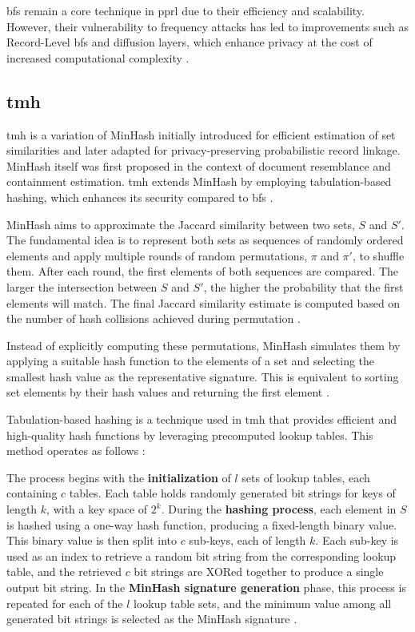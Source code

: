 \ac{bf}s remain a core technique in \ac{pprl} due to their efficiency and scalability.
However, their vulnerability to frequency attacks has led to improvements such as Record-Level \ac{bf}s and diffusion layers, which enhance privacy at the cost of increased computational complexity \cite{schaefer2024, vidanage2020graph,armknecht2023strengthening}.


\subsection{\ac{tmh}} \label{sec:tmh}

\ac{tmh} is a variation of MinHash initially introduced for efficient estimation of set similarities and later adapted for privacy-preserving probabilistic record linkage.
MinHash itself was first proposed in the context of document resemblance and containment estimation.
\ac{tmh} extends MinHash by employing tabulation-based hashing, which enhances its security compared to \ac{bf}s \cite{vidanage2020graph,broder1997resemblance}.

MinHash aims to approximate the Jaccard similarity between two sets, \(S\) and \(S'\).
The fundamental idea is to represent both sets as sequences of randomly ordered elements and apply multiple rounds of random permutations, \(\pi\) and \(\pi'\), to shuffle them.
After each round, the first elements of both sequences are compared.
The larger the intersection between \(S\) and \(S'\), the higher the probability that the first elements will match.
The final Jaccard similarity estimate is computed based on the number of hash collisions achieved during permutation \cite{schaefer2024,broder1997resemblance,vidanage2020graph}.

Instead of explicitly computing these permutations, MinHash simulates them by applying a suitable hash function to the elements of a set and selecting the smallest hash value as the representative signature.
This is equivalent to sorting set elements by their hash values and returning the first element \cite{schaefer2024}.

Tabulation-based hashing is a technique used in \ac{tmh} that provides efficient and high-quality hash functions by leveraging precomputed lookup tables.
This method operates as follows \cite{vidanage2020graph}:

The process begins with the \textbf{initialization} of \(l\) sets of lookup tables, each containing \(c\) tables.
Each table holds randomly generated bit strings for keys of length \(k\), with a key space of \(2^k\).
During the \textbf{hashing process}, each element in \(S\) is hashed using a one-way hash function, producing a fixed-length binary value.
This binary value is then split into \(c\) sub-keys, each of length \(k\).
Each sub-key is used as an index to retrieve a random bit string from the corresponding lookup table, and the retrieved \(c\) bit strings are XORed together to produce a single output bit string.
In the \textbf{MinHash signature generation} phase, this process is repeated for each of the \(l\) lookup table sets, and the minimum value among all generated bit strings is selected as the MinHash signature \cite{schaefer2024,vidanage2020graph}.

